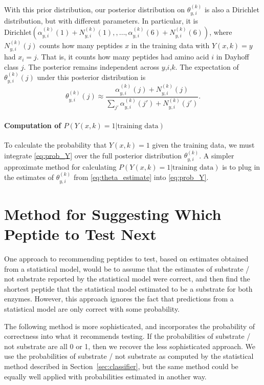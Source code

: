 \documentclass[12pt]{article}
\newcommand{\data}{\text{training data}}
\begin{document}
With this prior distribution, our posterior distribution on $\theta^{(k)}_{y,i}$ is also a Dirichlet distribution, but with different parameters.
In particular, it is 
$\mathrm{Dirichlet}(
\alpha^{(k)}_{y,i}(1) + N^{(k)}_{y,i}(1), 
,\ldots,
\alpha^{(k)}_{y,i}(6) + N^{(k)}_{y,i}(6))$,
where $N^{(k)}_{y,i}(j)$ counts how many peptides $x$ in the training data with $Y(x,k)=y$ had $x_i=j$.  That is, it counts how many peptides had amino acid $i$ in Dayhoff class $j$.
The posterior remains independent across $y$,$i$,$k$.
The expectation of $\theta^{(k)}_{y,i}(j)$ under this posterior distribution is 
\begin{equation}
  \label{eq:theta_estimate}
  \theta^{(k)}_{y,i}(j) \approx
  \frac{\alpha^{(k)}_{y,i}(j) + N^{(k)}_{y,i}(j)}{\sum_{j'} \alpha^{(k)}_{y,i}(j') + N^{(k)}_{y,i}(j')}.
\end{equation}

\paragraph{Computation of $P(Y(x,k)=1 | \data)$}
To calculate the probability that $Y(x,k)=1$ given the training data, we must integrate \eqref{eq:prob_Y} over the full posterior distribution $\theta^{(k)}_{y,i}$.
A simpler approximate method for calculating $P(Y(x,k)=1 | \data)$ is to plug in the estimates of $\theta^{(k)}_{y,i}$ from \eqref{eq:theta_estimate} into \eqref{eq:prob_Y}.

\section{Method for Suggesting Which Peptide to Test Next}
\label{sec:design}
One approach to recommending peptides to test, based on estimates obtained from
a statistical model, would be to assume that the estimates of substrate / not
substrate reported by the statistical model were correct, and then find the
shortest peptide that the statistical model estimated to be a substrate for
both enzymes.  However, this approach ignores the fact that predictions from a
statistical model are only correct with some probability.  

The following method is more sophisticated, and incorporates the probability of
correctness into what it recommends testing.  If the probabilities of substrate
/ not substrate are all 0 or 1, then we recover the less sophisticated approach.
We use the probabilities of substrate / not substrate as computed by the
statistical method described in Section~\ref{sec:classifier}, but the same
method could be equally well applied with probabilities estimated in another
way.
\end{document}
